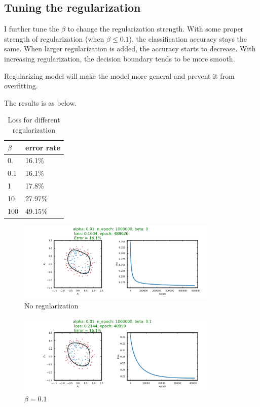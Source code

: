 \subsection{Tuning the regularization}

I further tune the $\beta$ to change the regularization strength. With some proper strength of regularization (when $\beta \leq 0.1 $), the classification accuracy stays the same. When larger regularization is added, the accuracy starts to decrease. With increasing regularization, the decision boundary tends to be more smooth. 

Regularizing model will make the model more general and prevent it from overfitting.

The results is as below.

\begin{table}[htb]
\centering
\caption{Loss for different regularization}
\begin{tabular}{|l|l|}
\hline
$\beta$ & error rate \\ \hline
0. & 16.1\% \\ \hline
0.1 & 16.1\% \\ \hline
1 &  17.8\% \\ \hline
10 & 27.97\% \\ \hline
100 & 49.15\% \\ \hline
\hline
\end{tabular}
\label{tab:alpha}
\end{table}

\begin{figure}[H]
\centering
  \includegraphics[width=0.85\textwidth]{fig/prob3/alpha_0_01_n_epoch1000000_beta_0.png}
\centering 
\caption{\protect No regularization}
\label{fig:15th}
\end{figure}

\begin{figure}[H]
\centering
  \includegraphics[width=0.85\textwidth]{fig/prob3/alpha_0_01_n_epoch1000000_beta_0_1.png}
\centering 
\caption{\protect $\beta = 0.1$}
\label{fig:15th}
\end{figure}

